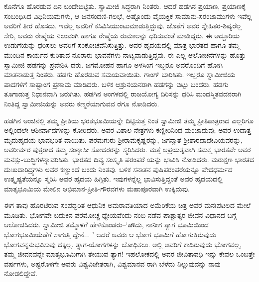 ಕೊನೆಗೂ ಹೊರಡುವ ದಿನ ಬಂದೇಬಿಟ್ಟಿತು. ಸ್ವಾಮೀಜಿ ಸಿದ್ಧರಾಗಿ ನಿಂತರು. ಆದರೆ ಹಡಗಿನ ಪ್ರಯಾಣ, ಪ್ರಯಾಣಕ್ಕೆ ಸಂಬಂಧಿಸಿದ ವಿಧಿನಿಯಮಗಳು, ಆ ಜನಸಂದಣಿ-ಗಲಭೆ, ಅಷ್ಟೊಂದು ವೈಯಕ್ತಿಕ ಸಾಮಾನು-ಸರಂಜಾಮುಗಳು ಇವೆಲ್ಲ ಅವರಿಗೆ ತೀರ ಹೊಸದು. ಇವೆಲ್ಲ ಅವರಿಗೆ ಕಸಿವಿಸಿಯುಂಟುಮಾಡುತ್ತಿದ್ದುವು. ಜೊತೆಗೆ ಅವರ ಸ್ನೇಹಿತರ-ಶಿಷ್ಯರೆಲ್ಲ ಸೇರಿ, ಅವರು ರೇಷ್ಮೆಯ ನಿಲುವಂಗಿ ಹಾಗೂ ರೇಷ್ಮೆಯ ರುಮಾಲನ್ನು ಧರಿಸುವಂತೆ ಮಾಡಿದ್ದರು. ಈ ಅದ್ದೂರಿಯ ಉಡುಗೆಯನ್ನು ಧರಿಸಲು ಅವರಿಗೆ ಸಂಕೋಚವೆನಿಸುತ್ತಿತ್ತು. ಅವರ ಹೃದಯದಲ್ಲಿ ಮಾತ್ರ ಭಾರತದ ಹಾಗೂ ತಮ್ಮ ಮುಂದಿನ ಕಾರ್ಯದ ಕುರಿತಾದ ನೂರಾರು ಭಾವನೆಗಳು ನಾಟ್ಯವಾಡುತ್ತಿದ್ದವು. ಈ ಎಲ್ಲ ಆಲೋಚನೆಗಳನ್ನು ಹೊತ್ತು ಸ್ವಾಮೀಜಿ ಹಡಗನ್ನು ಪ್ರವೇಶಿಸಿ ದರು. ಜಗಮೋಹನ ಹಾಗೂ ಅಳಸಿಂಗ ಇಬ್ಬರೂ ಅವರೊಂದಿಗೆ ಹೋಗಿ ಮಾತನಾಡುತ್ತ ನಿಂತರು. ಹಡಗು ಹೊರಡುವ ಸಮಯವಾಯಿತು. ಗಾಂಗ್ ಬಾರಿಸಿತು. ಇಬ್ಬರೂ ಸ್ವಾಮೀಜಿಯ ಪಾದಗಳಿಗೆ ಸಾಷ್ಟಾಂಗ ಪ್ರಣಾಮ ಮಾಡಿದರು. ಬಳಿಕ ಆಶ್ರುನಯನರಾಗಿ ಹಡಗನ್ನು ಬಿಟ್ಟು ಬಂದರು. ಹಡಗು ತೂಗಾಡುತ್ತ ನಿಧಾನವಾಗಿ ಜರುಗಿತು. ಹಡಗಿನ ಅಂಗಳದಲ್ಲಿ ರಾಜಯೋಗ್ಯ ದಿರಿಸನ್ನು ಧರಿಸಿ ಮಂದಸ್ಮಿತವದನರಾಗಿ ನಿಂತಿದ್ದ ಸ್ವಾಮೀಜಿಯನ್ನು ಅವರು ಕಣ್ಮರೆಯಾಗುವವ ರೆಗೂ ನೋಡಿದರು.

ಹಡಗಿನ ಅಂಚಿನಲ್ಲಿ ತಮ್ಮ ಪ್ರೀತಿಯ ಭರತಭೂಮಿಯನ್ನೇ ದಿಟ್ಟಿಸುತ್ತ ನಿಂತ ಸ್ವಾಮೀಜಿ ತಮ್ಮ ಪ್ರೀತಿಪಾತ್ರರಾದ ಎಲ್ಲರಿಗೂ ಅಲ್ಲಿಂದಲೇ ಆಶೀರ್ವಾದಗಳನ್ನು ಕೋರಿದರು. ಅವರ ವಿಶಾಲ ನೇತ್ರಗಳು ಕಣ್ಣೀರಿನಿಂದ ಮಂಜಾದುವು; ಅವರ ಉದಾತ್ತ ಮೃದುಹೃದಯ ಭಾವಭರಿತ ವಾಯಿತು. ಪರಮಗುರು ಶ್ರೀರಾಮಕೃಷ್ಣರನ್ನು, ಜಗನ್ಮಾತೆ ಶ್ರೀಶಾರದಾದೇವಿಯವರನ್ನು, ಅವರೀರ್ವರ ಪುತ್ರರಾದ ತಮ್ಮ ಸಂನ್ಯಾಸೀ ಸೋದರರನ್ನು ಸ್ಮರಿಸಿದರು. ಮತ್ತೆ ಅಪ್ರಯತ್ನವಾಗಿ ಸಮಸ್ತ ಭಾರತವೇ ಅವರ ಮನಸ್ಸು-ಬುದ್ಧಿಗಳನ್ನಾವರಿಸಿತು. ಭಾರತದ ದಿವ್ಯ ಸಂಸ್ಕೃತಿ ಪರಂಪರೆ ಯನ್ನು ಭಾವಿಸಿ ನೋಡಿದರು. ಮರುಕ್ಷಣ ಭಾರತದ ದುಃಖದಾರಿದ್ರ್ಯಗಳು ಅವರ ಕಣ್ಣುಂದೆ ಬಂದು ನಿಂತವು. ಬಳಿಕ ಸನಾತನ ಪುಷಿಪರಂಪರೆಯನ್ನೂ ವೇದಧರ್ಮದ ಉತ್ಕೃಷ್ಟತೆಯನ್ನೂ ಸ್ಮರಿಸಿ ಅವರ ಹೃದಯ ಹಿಗ್ಗಿತು. ಇವುಗಳನ್ನೆಲ್ಲ ಭಾವಿಸುತ್ತಿದ್ದಂತೆ ಅವರ ಹೃದಯದಲ್ಲಿ ಮಾತೃಭೂಮಿಯ ಮೇಲಿನ ಆಭಿಮಾನ-ಪ್ರೀತಿ-ಗೌರವಗಳು ಮಹಾಪೂರವಾಗಿ ಉಕ್ಕಿದುವು.

ಈಗ ತಾವು ಹೊರಟಿರುವ ಸಂಪದ್ಭರಿತ ಆಧುನಿಕ ಅಮರಾವತಿಯಾದ ಅಮೆರಿಕೆಯ ಚಿತ್ರ ಅವರ ಮನಃಪಟಲದ ಮೇಲೆ ಮೂಡಿತು. ಭೋಗವೇ ಬದುಕಿನ ಪರಮೋಚ್ಚ ಧ್ಯೇಯವೆಂದು ನಂಬಿ ನಡೆವ ಪಾಶ್ಚಾತ್ಯರ ಜೀವನ ವಿಧಾನದ ಬಗ್ಗೆ ಆಲೋಚಿಸಿದರು. ಸ್ವಾಮೀಜಿ ತಮ್ಮೊಳಗೆ ಹೇಳಿಕೊಂಡರು–‘ಹೌದು, ನಾನೀಗ ತ್ಯಾಗ ಭೂಮಿಯಿಂದ ಭೋಗಭೂಮಿಯೆಡೆಗೆ ಸಾಗುತ್ತಿ ದ್ದೇನೆ... ’ ಆದರೆ ಅವರು ಆ ಭೋಗ ಭೂಮಿಗೆ ಹೋಗುತ್ತಿರುವುದು ಭೋಗವನ್ನನುಭವಿಸುವು ದಕ್ಕಲ್ಲ. ತ್ಯಾಗ-ಯೋಗಗಳನ್ನು ಬೋಧಿಸಲು. ಅಲ್ಲಿ ಅವರಿಗೆ ಕಾದಿರುವುದು ಭೋಗವಲ್ಲ, ತಮ್ಮ ಜೀವನವನ್ನೇ ಮಾತೃಭೂಮಿಗಾಗಿ ತೇಯುವ ತ್ಯಾಗ! ಇಹಲೋಕದಲ್ಲಿ ಅವರ ಜೀವಿತಾವಧಿ ಇನ್ನು ಕೇವಲ ಒಂಬತ್ತೇ ವರ್ಷಗಳು, ಅಷ್ಟರೊಳಗೇ ಅವರು ವಿಶ್ವವಿಜೇತರಾಗಿ, ವಿಶ್ವಮಾನವ ರಾಗಿ ಬೆಳೆದು ನಿಲ್ಲುವುದನ್ನು ನಾವು ನೋಡಲಿದ್ದೇವೆ.


